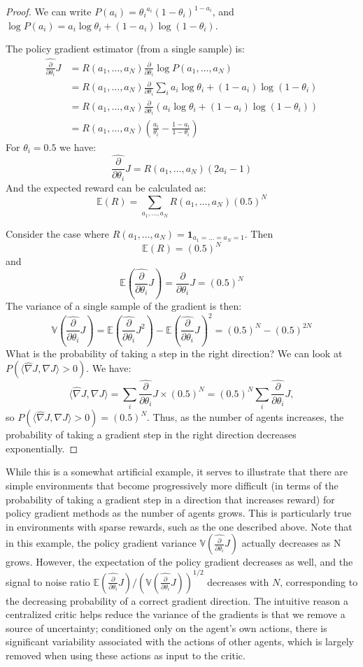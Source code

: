 \documentclass{article}
\newcommand{\dd}{\frac{\partial}{\partial \theta_i}}
\begin{document}
\begin{proof}
We can write $P(a_i) = {\theta_i}^{a_i}  (1-\theta_i)^{1-a_i}$, and $\log P(a_i) = a_i \log {\theta_i} + (1-a_i)\log(1-\theta_i)$.

The policy gradient estimator (from a single sample) is:
\begin{equation}
\begin{split}
\hat{\dd} J &= R(a_1,\dots,a_N) \dd \log P(a_1,\dots,a_N) \\ 
& = R(a_1,\dots,a_N) \dd \sum_i a_i \log {\theta_i} + (1-a_i)\log(1-\theta_i) \\
& = R(a_1,\dots,a_N) \dd (a_i \log {\theta_i} + (1-a_i)\log(1-\theta_i)) \\
& = R(a_1,\dots,a_N) \left(\frac{a_i}{\theta_i} - \frac{1-a_i}{1-\theta_i} \right)
\end{split}    
\end{equation}
For $\theta_i = 0.5$ we have: 
$$
\hat{\dd} J = R(a_1,\dots,a_N) \left(2 a_i- 1\right)
$$
And the expected reward can be calculated as:
$$
\mathbb E (R) = \sum_{a_1,\dots,a_N} R(a_1,\dots,a_N) (0.5)^N
$$

Consider the case where $R(a_1,\dots,a_N) = \mathbf{1}_{a_1=\dots=a_N=1}$. Then 
$$
\mathbb E (R) = (0.5)^N
$$
and 
$$
\mathbb E (\hat{\dd} J ) = \dd J = (0.5)^N
$$
The variance of a single sample of the gradient is then:
$$
\mathbb V (\hat{\dd} J ) = \mathbb E (\hat{\dd} J^2 ) - \mathbb E (\hat{\dd} J ) ^2 = (0.5)^N - (0.5)^{2N}
$$
What is the probability of taking a step in the right direction? We can look at $P(\langle \hat{\nabla} J, \nabla J \rangle > 0)$. We have:
$$
\langle \hat{\nabla} J, \nabla J \rangle = \sum_i \hat{\dd} J  \times (0.5)^N = (0.5)^N \sum_i \hat{\dd} J,
$$
so $P(\langle \hat{\nabla} J, \nabla J \rangle > 0) = (0.5)^N$. Thus, as the number of agents increases, the probability of taking a gradient step in the right direction decreases exponentially.
\end{proof}

While this is a somewhat artificial example, it serves to illustrate that there are simple environments that become progressively more difficult  (in terms of the probability of taking a gradient step in a direction that increases reward) for policy gradient methods as the number of agents grows. This is particularly true in environments with sparse rewards, such as the one described above. Note that in this example, the policy gradient variance $\mathbb V (\hat{\dd} J )$ actually decreases as N grows. However, the expectation of the policy gradient decreases as well, and the signal to noise ratio $\mathbb E (\hat{\dd} J ) / (\mathbb V (\hat{\dd} J ))^{1/2}$ decreases with $N$, corresponding to the decreasing probability of a correct gradient direction. The intuitive reason a centralized critic helps reduce the variance of the gradients is that we remove a source of uncertainty; conditioned only on the agent's own actions, there is significant variability associated with the actions of other agents, which is largely removed when using these actions as input to the critic.
\end{document}
